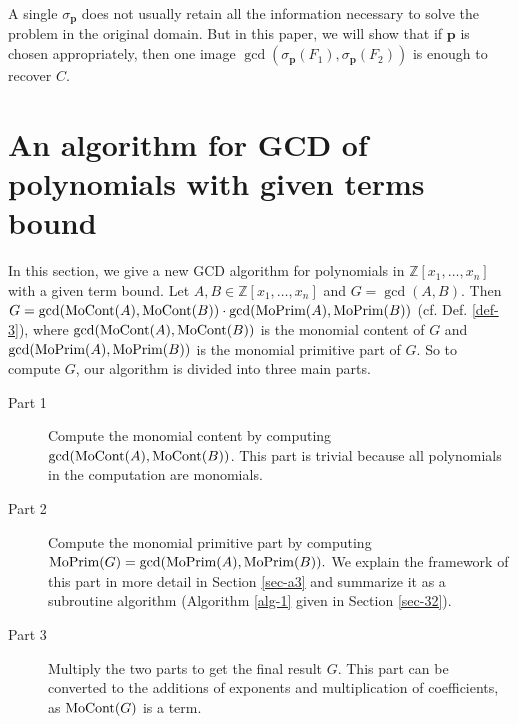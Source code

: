 \documentclass[final,20pt]{elsarticle}
\def\Z{{\mathbb Z}}
\def\MoCont{\hbox{\rm{MoCont}}}
\def\MoPrim{\hbox{\rm{MoPrim}}}
\begin{document}
A single $\sigma_\mathbf{p}$ does not usually retain all the information
necessary to solve the problem in the original domain.
But in this paper, we will show that if $\mathbf{p}$ is chosen appropriately, then one image $\gcd(\sigma_\mathbf{p}(F_1),\sigma_\mathbf{p}(F_2))$ is enough to recover $C$.


\section{An algorithm for GCD of polynomials with given terms bound}
In this section, we give a new GCD algorithm for polynomials in $\Z[x_1,\dots,x_n]$ with a given term bound.
Let $A,B\in\Z[x_1,\dots,x_n]$ and $G=\gcd(A,B)$.
%
Then
$
G=\gcd(\MoCont(A),\MoCont(B))\cdot \gcd( \MoPrim(A),\MoPrim(B))
$ (cf. Def. \ref{def-3}),
where $\gcd(\MoCont(A),\MoCont(B))$ is the monomial content of $G$ and
$\gcd(\MoPrim(A),\MoPrim(B))$ is the monomial primitive part of $G$.
%
So to compute $G$, our algorithm is divided into three main parts.

\begin{description}
\item[Part 1] Compute the monomial content by computing $\gcd(\MoCont(A),\MoCont(B))$. This part is trivial because all polynomials in the computation are monomials.

\item[Part 2] Compute the monomial primitive part by computing $\MoPrim(G)=\gcd(\MoPrim(A),\MoPrim(B)).$ We explain the framework of this part in more detail in Section \ref{sec-a3} and summarize it as a subroutine algorithm (Algorithm \ref{alg-1} given in Section \ref{sec-32}).

\item[Part 3] Multiply the two parts to get the final result $G$. This part can be converted to the additions of exponents and multiplication of coefficients, as $\MoCont(G)$ is a term.
\end{description}
\end{document}
